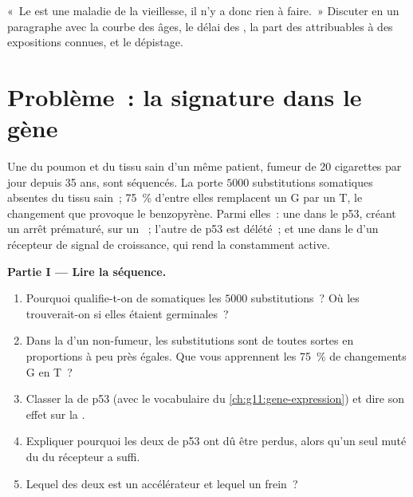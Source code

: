 \begin{exercise}[$\star\star\star$]\label{exo:g11:cancer:15}
«~Le  est une maladie de la vieillesse, il n'y a donc rien à
faire.~» Discuter en un paragraphe avec la courbe des âges, le délai
des , la part des  attribuables à des
expositions connues, et le dépistage.
\end{exercise}

\section{Problème~: la signature dans le gène}

\begin{problem}
\label{pb:g11:cancer:1}
Une  du poumon et du tissu sain d'un même patient, fumeur de 20
cigarettes par jour depuis 35 ans, sont séquencés. La  porte
$\num{5000}$ substitutions somatiques absentes du tissu sain~; 75~\%
d'entre elles remplacent un G par un T, le changement que provoque le
benzopyrène. Parmi elles~: une dans le  p53, créant un arrêt
prématuré, sur un ~; l'autre  de p53 est délété~; et une
dans le  d'un récepteur de signal de croissance, qui rend la
 constamment active.

\medskip
\noindent\textbf{Partie I --- Lire la séquence.}
\begin{enumerate}
  \item Pourquoi qualifie-t-on de somatiques les $\num{5000}$
        substitutions~? Où les trouverait-on si elles étaient
        germinales~?
  \item Dans la  d'un non-fumeur, les substitutions sont de
        toutes sortes en proportions à peu près égales. Que vous
        apprennent les 75~\% de changements G en T~?
  \item Classer la  de p53 (avec le vocabulaire du
        \cref{ch:g11:gene-expression}) et dire son effet sur la
        .
  \item Expliquer pourquoi les deux  de p53 ont dû être perdus,
        alors qu'un seul  muté du  du récepteur a suffi.
  \item Lequel des deux  est un accélérateur et lequel un frein~?
\end{enumerate}


\end{problem}

